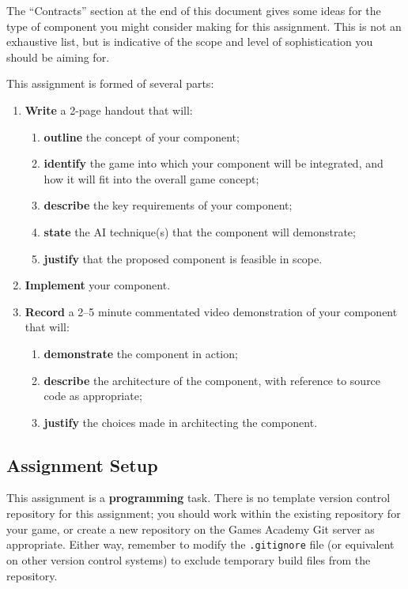 \documentclass{../../fal_assignment}
\begin{document}
The ``Contracts'' section at the end of this document gives some ideas for the type of component you might consider making for this assignment.
This is not an exhaustive list, but is indicative of the scope and level of sophistication you should be aiming for.

This assignment is formed of several parts:
\begin{enumerate}[label=(\Alph*)]
	\item \textbf{Write} a 2-page handout that will:
		\begin{enumerate}[label=(\roman*)]
			\item \textbf{outline} the concept of your component;
			\item \textbf{identify} the game into which your component will be integrated, and how it will fit into
				the overall game concept;
			\item \textbf{describe} the key requirements of your component;
			\item \textbf{state} the AI technique(s) that the component will demonstrate;
			\item \textbf{justify} that the proposed component is feasible in scope.
		\end{enumerate}
	\item \textbf{Implement} your component.
	\item \textbf{Record} a 2--5 minute commentated video demonstration of your component that will:
		\begin{enumerate}[label=(\roman*)]
			\item \textbf{demonstrate} the component in action;
			\item \textbf{describe} the architecture of the component, with reference to source code as appropriate;
			\item \textbf{justify} the choices made in architecting the component.
		\end{enumerate}
\end{enumerate}

\subsection*{Assignment Setup}

This assignment is a \textbf{programming} task.
There is no template version control repository for this assignment;
you should work within the existing repository for your game,
or create a new repository on the Games Academy Git server as appropriate.
Either way, remember to modify the \texttt{.gitignore} file (or equivalent on other version control systems) to exclude temporary build files
from the repository.
\end{document}
